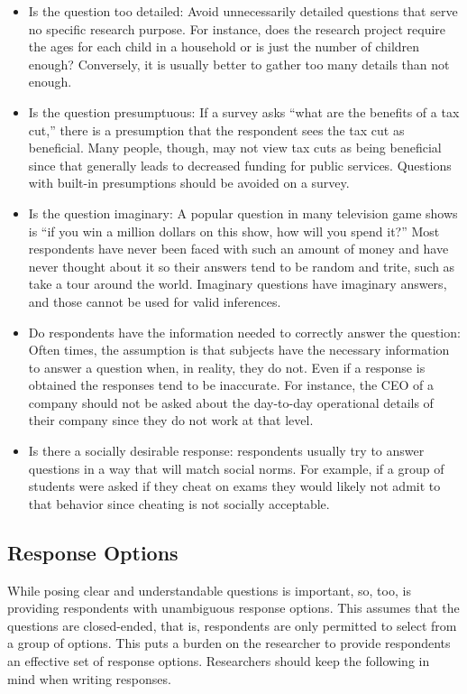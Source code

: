 \begin{itemize}
	\item Is the question too detailed: Avoid unnecessarily detailed questions that serve no specific research purpose. For instance, does the research project require the ages for each child in a household or is just the number of children enough? Conversely, it is usually better to gather too many details than not enough.

	\item Is the question presumptuous: If a survey asks ``what are the benefits of a tax cut,'' there is a presumption that the respondent sees the tax cut as beneficial. Many people, though, may not view tax cuts as being beneficial since that generally leads to decreased funding for public services. Questions with built-in presumptions should be avoided on a survey.

	\item Is the question imaginary: A popular question in many television game shows is ``if you win a million dollars on this show, how will you spend it?'' Most respondents have never been faced with such an amount of money and have never thought about it so their answers tend to be random and trite, such as take a tour around the world. Imaginary questions have imaginary answers, and those cannot be used for valid inferences.

	\item Do respondents have the information needed to correctly answer the question: Often times, the assumption is that subjects have the necessary information to answer a question when, in reality, they do not. Even if a response is obtained the responses tend to be inaccurate. For instance, the CEO of a company should not be asked about the day-to-day operational details of their company since they do not work at that level.

	\item Is there a socially desirable response: respondents usually try to answer questions in a way that will match social norms. For example, if a group of students were asked if they cheat on exams they would likely not admit to that behavior since cheating is not socially acceptable. 
\end{itemize}

\subsection{Response Options}

While posing clear and understandable questions is important, so, too, is providing respondents with unambiguous response options. This assumes that the questions are closed-ended, that is, respondents are only permitted to select from a group of options. This puts a burden on the researcher to provide respondents an effective set of response options. Researchers should keep the following in mind when writing responses.

